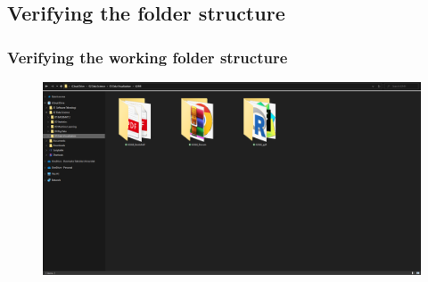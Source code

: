 \documentclass{beamer}
\begin{document}
\subsection{Verifying the folder structure }
\begin{frame}
\frametitle{Verifying the working folder structure}
\begin{figure}
\includegraphics[width=1\linewidth]{Seminar_1_images/file structure.PNG}
\end{figure}
\end{frame}
\end{document}
